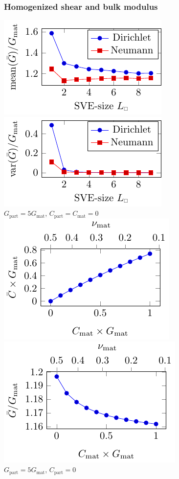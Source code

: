 \documentclass[11pt]{beamer} %
\begin{document}
\begin{frame}
 \frametitle{Homogenized shear and bulk modulus}
\begin{center}
%
\includegraphics[width=0.4\linewidth]{figures/meanG}
%
\includegraphics[width=0.4\linewidth]{figures/varG}
\\
$G_\mathrm{part} = 5 G_\mathrm{mat}$, $C_\mathrm{part} = C_\mathrm{mat} = 0$
\\%
%
\includegraphics[width=0.4\linewidth]{figures/CGmat}
%
\includegraphics[width=0.4\linewidth]{figures/GGmat}
\\
$G_\mathrm{part} = 5 G_\mathrm{mat}$, $C_\mathrm{part} = 0$
\end{center}
\end{frame}
\end{document}
